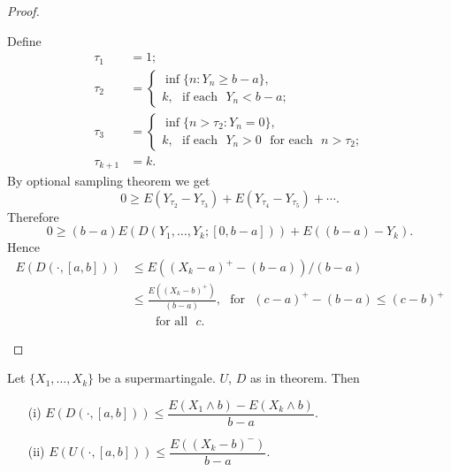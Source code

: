 \begin{proof}
\begin{enumerate}
Define\pageoriginale
\begin{align*}
\tau_{1} &= 1;\\[3pt]
\tau_{2} &=
\begin{cases}
\inf \{n:Y_{n}\geq b-a\},\\
k,\text{~ if each~ } Y_{n}<b-a;
\end{cases}\\[5pt]
\tau_{3} &=
\begin{cases}
\inf \{n>\tau_{2}:Y_{n}=0\},\\
k,\text{~ if each~ }Y_{n}>0\text{~ for each~ }n>\tau_{2};
\end{cases}\\[5pt]
\tau_{k+1} &= k.
\end{align*}
By optional sampling theorem we get
$$
0\geq E(Y_{\tau_{2}}-Y_{\tau_{3}})+E(Y_{\tau_{4}}-Y_{\tau_{5}})+\cdots.
$$
Therefore
$$
0\geq (b-a)E(D(Y_{1},\ldots,Y_{k};[0,b-a]))+E((b-a)-Y_{k}).
$$
Hence
\begin{align*}
E(D(\cdot,[a,b])) &\leq E((X_{k}-a)^{+}-(b-a))/(b-a)\\[5pt]
&\leq \frac{E((X_{k}-b)^{+})}{(b-a)},\text{~ for~ }
(c-a)^{+}-(b-a)\leq (c-b)^{+}\\
&\qquad\text{for all~ } c.
\end{align*}
\end{enumerate}
\end{proof}

\begin{coro*}
Let $\{X_{1},\ldots,X_{k}\}$ be a supermartingale. $U$, $D$ as in
theorem. Then
\begin{itemize}
\item[\rm(i)] $E(D(\cdot,[a,b]))\leq \dfrac{E(X_{1}\wedge
  b)-E(X_{k}\wedge b)}{b-a}$.

\item[\rm(ii)] $E(U(\cdot,[a,b]))\leq \dfrac{E((X_{k}-b)^{-})}{b-a}$.
\end{itemize}
\end{coro*}

